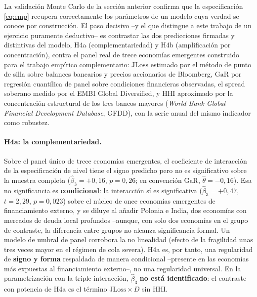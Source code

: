 \documentclass[11pt]{article}
\theoremstyle{plain}
\theoremstyle{definition}
\theoremstyle{remark}
\newcommand{\JLoss}{\mathrm{JLoss}}
\newcommand{\GaR}{\mathrm{GaR}}
\newcommand{\HHI}{\mathrm{HHI}}
\newcommand{\1}{\mathbf{1}}
\begin{document}
La validación Monte Carlo de la sección anterior confirma que la especificación \eqref{eq:emp} recupera correctamente los parámetros de un modelo cuya verdad se conoce por construcción. El paso decisivo --y el que distingue a este trabajo de un ejercicio puramente deductivo-- es contrastar las dos predicciones firmadas y distintivas del modelo, H4a (complementariedad) y H4b (amplificación por concentración), contra el panel real de trece economías emergentes construido para el trabajo empírico complementario: $\JLoss$ estimado por el método de punto de silla sobre balances bancarios y precios accionarios de Bloomberg, $\GaR$ por regresión cuantílica de panel sobre condiciones financieras observadas, el spread soberano medido por el EMBI Global Diversified, y $\HHI$ aproximado por la concentración estructural de los tres bancos mayores (\textit{World Bank Global Financial Development Database}, GFDD), con la serie anual del mismo indicador como robustez.

\paragraph{H4a: la complementariedad.} Sobre el panel único de trece economías emergentes, el coeficiente de interacción de la especificación de nivel tiene el signo predicho pero no es significativo sobre la muestra completa ($\hat\beta_3=+0{,}16$, $p=0{,}26$; en convención $\GaR$, $\hat\theta=-0{,}16$). Esa no significancia es \textbf{condicional}: la interacción sí es significativa ($\hat\beta_3=+0{,}47$, $t=2{,}29$, $p=0{,}023$) sobre el núcleo de once economías emergentes de financiamiento externo, y se diluye al añadir Polonia e India, dos economías con mercados de deuda local profundos --aunque, con solo dos economías en el grupo de contraste, la diferencia entre grupos no alcanza significancia formal. Un modelo de umbral de panel corrobora la no linealidad (efecto de la fragilidad unas tres veces mayor en el régimen de cola severa). H4a es, por tanto, una regularidad de \textbf{signo y forma} respaldada de manera condicional --presente en las economías más expuestas al financiamiento externo--, no una regularidad universal. En la parametrización con la triple interacción, $\hat\beta_3$ \textbf{no está identificado}: el contraste con potencia de H4a es el término $\JLoss\times D$ sin $\HHI$.
\end{document}

